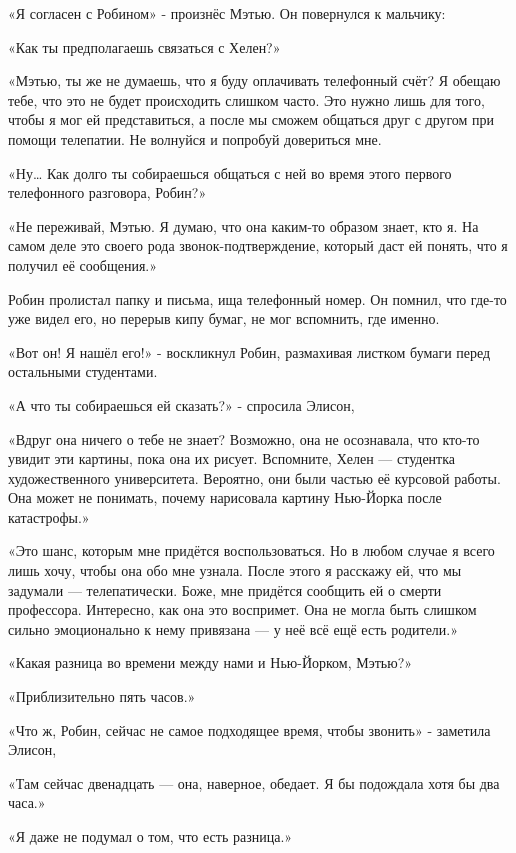 \documentclass[a4paper,12pt]{book}
\begin{document}
\par
«Я согласен с Робином» - произнёс Мэтью. Он повернулся к мальчику:
\par
«Как ты предполагаешь связаться с Хелен?»
\par
«Мэтью, ты же не думаешь, что я буду оплачивать телефонный счёт? Я обещаю тебе, что это не будет происходить слишком часто. Это нужно лишь для того, чтобы я мог ей представиться, а после мы сможем общаться друг с другом при помощи телепатии. Не волнуйся и попробуй довериться мне.
\par
«Ну… Как долго ты собираешься общаться с ней во время этого первого телефонного разговора, Робин?»
\par
«Не переживай, Мэтью. Я думаю, что она каким-то образом знает, кто я. На самом деле это своего рода звонок-подтверждение, который даст ей понять, что я получил её сообщения.»
\par
Робин пролистал папку и письма, ища телефонный номер. Он помнил, что где-то уже видел его, но перерыв кипу бумаг, не мог вспомнить, где именно.
\par
«Вот он! Я нашёл его!» - воскликнул Робин, размахивая листком бумаги перед остальными студентами.
\par
«А что ты собираешься ей сказать?» - спросила Элисон,
\par
«Вдруг она ничего о тебе не знает? Возможно, она не осознавала, что кто-то увидит эти картины, пока она их рисует. Вспомните, Хелен — студентка художественного университета. Вероятно, они были частью её курсовой работы. Она может не понимать, почему нарисовала картину Нью-Йорка после катастрофы.»
\par
«Это шанс, которым мне придётся воспользоваться. Но в любом случае я всего лишь хочу, чтобы она обо мне узнала. После этого я расскажу ей, что мы задумали — телепатически. Боже, мне придётся сообщить ей о смерти профессора. Интересно, как она это воспримет. Она не могла быть слишком сильно эмоционально к нему привязана — у неё всё ещё есть родители.»
\par
«Какая разница во времени между нами и Нью-Йорком, Мэтью?»
\par
«Приблизительно пять часов.»
\par
«Что ж, Робин, сейчас не самое подходящее время, чтобы звонить» - заметила Элисон,
\par
«Там сейчас двенадцать — она, наверное, обедает. Я бы подождала хотя бы два часа.»
\par
«Я даже не подумал о том, что есть разница.»
\par
\end{document}
